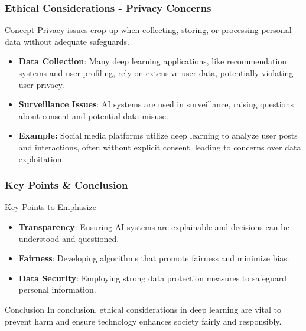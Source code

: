 \documentclass[aspectratio=169]{beamer}
\begin{document}
\begin{frame}[fragile]
    \frametitle{Ethical Considerations - Privacy Concerns}
    \begin{block}{Concept}
        Privacy issues crop up when collecting, storing, or processing personal data without adequate safeguards.
    \end{block}

    \begin{itemize}
        \item \textbf{Data Collection}:
        Many deep learning applications, like recommendation systems and user profiling, rely on extensive user data, potentially violating user privacy.
        
        \item \textbf{Surveillance Issues}:
        AI systems are used in surveillance, raising questions about consent and potential data misuse.
        
        \item \textbf{Example:}
        Social media platforms utilize deep learning to analyze user posts and interactions, often without explicit consent, leading to concerns over data exploitation.
    \end{itemize}
\end{frame}

\begin{frame}[fragile]
    \frametitle{Key Points & Conclusion}
    \begin{block}{Key Points to Emphasize}
        \begin{itemize}
            \item \textbf{Transparency}: Ensuring AI systems are explainable and decisions can be understood and questioned.
            \item \textbf{Fairness}: Developing algorithms that promote fairness and minimize bias.
            \item \textbf{Data Security}: Employing strong data protection measures to safeguard personal information.
        \end{itemize}
    \end{block}

    \begin{block}{Conclusion}
        In conclusion, ethical considerations in deep learning are vital to prevent harm and ensure technology enhances society fairly and responsibly. 
    \end{block}
\end{frame}
\end{document}
